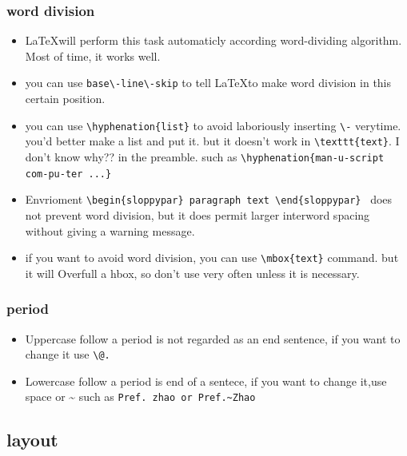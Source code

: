 \documentclass[a4paper,12pt,twoside]{book}
\begin{document}
		\subsubsection{word division}
			\begin{itemize}
			\item \LaTeX will perform this task automaticly according word-dividing algorithm. Most of time, it works well.
			\item you can use \verb=base\-line\-skip= to tell \LaTeX to make word division in this certain position.
			\item you can use \verb=\hyphenation{list}= to avoid laboriously inserting \verb=\-= verytime. you'd better make a list and put it.  but it doesn't work in \verb=\texttt{text}=. I don't know why??
			in the preamble. such as \verb=\hyphenation{man-u-script com-pu-ter ...}=
			\item Envrioment \verb=\begin{sloppypar} paragraph text \end{sloppypar}= \ does not prevent word division, but it does permit larger interword spacing without giving a warning message.
			\item if you want to avoid word division, you can use \verb=\mbox{text}= command. but it will Overfull a hbox, so don't use very often unless it is necessary.
			\end{itemize}
		\subsubsection{period}
			\begin{itemize}
			\item Uppercase follow a period is not regarded as an end sentence, if you want to change it use \verb=\@.=
			\item Lowercase follow a period is end of a sentece, if you want to change it,use space or \~{} such as \verb*=Pref. zhao or Pref.~Zhao=
			\end{itemize}
	\subsection{layout}
\end{document}
